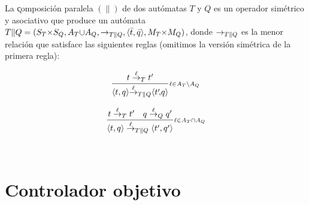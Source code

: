 \begin{definition}  \label{def:parcomp}
	La \k{composición paralela} $(\|)$ de dos autómatas $T$ y $Q$ es un operador simétrico y asociativo que produce un autómata $T \| Q = (S_T {\times} S_Q, A_T {\cup} 
	A_Q, \rightarrow_{T\|Q}, \langle\bar{t},\bar{q}\rangle, M_T {\times} M_Q)$, donde $\rightarrow_{T\|Q}$ es la menor relación que satisface las siguientes reglas (omitimos la versión simétrica de la primera regla):
	
	\begin{normalsize}
		\centering
		\vspace{-18pt}
		\hspace{-50pt}
		\begin{minipage}{0.30\linewidth}
			\[ 
			\frac{t \overset{\ell}{\rightarrow}_{T} t'}{\langle t,q\rangle {\overset{\ell}{\rightarrow}_{T\|Q}} \langle t'\!,\!q\rangle }{{\scriptstyle \ell \in A_{T} {\setminus} A_{Q}}} 
			\]
		\end{minipage} 
		\hspace{40pt}
		\begin{minipage}{0.30\linewidth}
			\[ 
			\frac{t \overset{\ell}{\rightarrow}_{T} t' \quad q \overset{\ell}{\rightarrow}_{Q} q'}{\langle t,q\rangle \overset{\ell}{\rightarrow}_{T\|Q} \langle t',q'\rangle}{{\scriptstyle \ell \in A_{T} {\cap} A_{Q}}}
			\]
		\end{minipage} \\[15pt]
	\end{normalsize}
\end{definition}

\section{Controlador objetivo}

